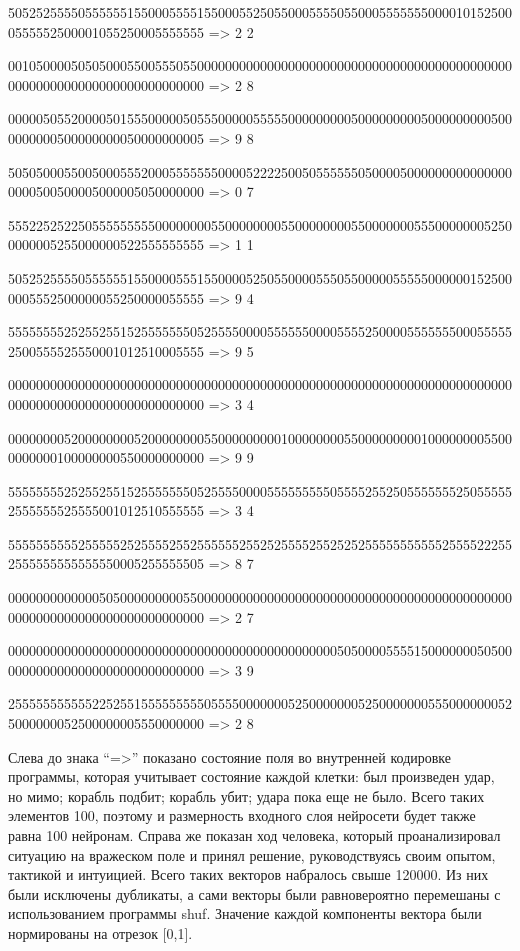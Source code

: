 \documentclass[12pt, a4paper, oneside]{article}
\begin{document}
{\scriptsize

5052525555055555515500055551550005525055000555505500055555550000101525000555552500001055250005555555 => 2 2

0010500005050500055005550550000000000000000000000000000000000000000000000000000000000000000000000000 => 2 8

0000050552000050155500000505550000055555000000000500000000050000000005000000000500000000050000000005 => 9 8

5050500055005000555200055555550000522225005055555505000050000000000000000000500500005000005050000000 => 0 7

5552252522505555555550000000055000000005500000000550000000555000000052500000005255000000522555555555 => 1 1

5052525555055555515500005551550000525055000055505500000555550000001525000005552500000055250000055555 => 9 4

5555555525255255152555555505255550000555555000055552500005555555000555552500555525550001012510005555 => 9 5

0000000000000000000000000000000000000000000000000000000000000000000000000000000000000000000000000000 => 3 4

0000000052000000005200000000550000000001000000005500000000010000000055000000000100000000550000000000 => 9 9

5555555525255255152555555505255550000555555555055552552505555555250555552555555525555001012510555555 => 3 4

5555555555255555252555525525555552552525555255252525555555555525555222552555555555555550005255555505 => 8 7

0000000000000505000000000550000000000000000000000000000000000000000000000000000000000000000000000000 => 2 7

0000000000000000000000000000000000000000000000050500005555150000000505000000000000000000000000000000 => 3 9

2555555555552252551555555555055550000000525000000052500000005550000000525000000052500000005550000000 => 2 8

}

\vspace{0.3cm}
Слева до знака ``=>'' показано состояние поля во внутренней кодировке программы, которая учитывает состояние каждой клетки: был произведен удар, но мимо; корабль подбит; корабль убит; удара пока еще не было. Всего таких элементов 100, поэтому и размерность входного слоя нейросети будет также равна 100 нейронам. Справа же показан ход человека, который проанализировал ситуацию на вражеском поле и принял решение, руководствуясь своим опытом, тактикой и интуицией.
Всего таких векторов набралось свыше 120000. Из них были исключены дубликаты, а сами векторы были равновероятно перемешаны с использованием программы shuf. Значение каждой компоненты вектора были нормированы на отрезок [0,1].
\end{document}
